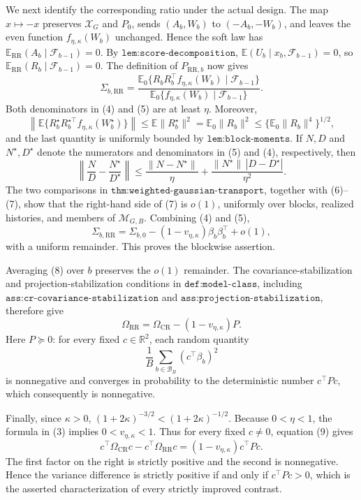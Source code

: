 We next identify the corresponding ratio under the actual design.  The map \(x\mapsto-x\) preserves \(\mathcal X_G\) and \(P_0\), sends \((A_b,W_b)\) to \((-A_b,-W_b)\), and leaves the even function \(f_{\eta,\kappa}(W_b)\) unchanged.  Hence the soft law has \(\mathbb E_{\mathrm{RR}}(A_b\mid\mathcal F_{b-1})=0\).  By \(\texttt{lem:score-decomposition}\), \(\mathbb E(U_b\mid x_b,\mathcal F_{b-1})=0\), so
\(\mathbb E_{\mathrm{RR}}(R_b\mid\mathcal F_{b-1})=0\).  The definition of \(P_{\mathrm{RR},b}\) now gives
\[
 \Sigma_{b,\mathrm{RR}}
 =\frac{\mathbb E_0\{R_bR_b^\top f_{\eta,\kappa}(W_b)
          \mid\mathcal F_{b-1}\}}
        {\mathbb E_0\{f_{\eta,\kappa}(W_b)\mid\mathcal F_{b-1}\}}. \tag{5}
\]
Both denominators in (4) and (5) are at least \(\eta\).  Moreover,
\[
 \left\|\mathbb E\{R_b^\star R_b^{\star\top}
 f_{\eta,\kappa}(W_b^\star)\}\right\|
 \leq \mathbb E\|R_b^\star\|^2
 =\mathbb E_0\|R_b\|^2
 \leq \{\mathbb E_0\|R_b\|^4\}^{1/2},                       \tag{6}
\]
and the last quantity is uniformly bounded by \(\texttt{lem:block-moments}\).  If \(N,D\) and \(N^\star,D^\star\) denote the numerators and denominators in (5) and (4), respectively, then
\[
 \left\|\frac ND-\frac{N^\star}{D^\star}\right\|
 \leq \frac{\|N-N^\star\|}{\eta}
      +\frac{\|N^\star\|\,|D-D^\star|}{\eta^2}.             \tag{7}
\]
The two comparisons in \(\texttt{thm:weighted-gaussian-transport}\), together with (6)--(7), show that the right-hand side of (7) is \(o(1)\), uniformly over blocks, realized histories, and members of \(\mathcal M_{G,B}\).  Combining (4) and (5),
\[
 \Sigma_{b,\mathrm{RR}}
 =\Sigma_{b,0}-(1-v_{\eta,\kappa})\beta_b\beta_b^\top+o(1), \tag{8}
\]
with a uniform remainder.  This proves the blockwise assertion.

Averaging (8) over \(b\) preserves the \(o(1)\) remainder.  The covariance-stabilization and projection-stabilization conditions in \(\texttt{def:model-class}\), including \(\texttt{ass:cr-covariance-stabilization}\) and \(\texttt{ass:projection-stabilization}\), therefore give
\[
 \Omega_{\mathrm{RR}}
 =\Omega_{\mathrm{CR}}-(1-v_{\eta,\kappa})P.                 \tag{9}
\]
Here \(P\succeq0\): for every fixed \(c\in\mathbb R^2\), each random quantity
\[
 \frac1B\sum_{b\in\mathcal B_B}(c^\top\beta_b)^2
\]
is nonnegative and converges in probability to the deterministic number \(c^\top Pc\), which consequently is nonnegative.

Finally, since \(\kappa>0\),
\((1+2\kappa)^{-3/2}<(1+2\kappa)^{-1/2}\).  Because \(0<\eta<1\), the formula in (3) implies \(0<v_{\eta,\kappa}<1\).  Thus for every fixed \(c\neq0\), equation (9) gives
\[
 c^\top\Omega_{\mathrm{CR}}c-c^\top\Omega_{\mathrm{RR}}c
 =(1-v_{\eta,\kappa})c^\top Pc.
\]
The first factor on the right is strictly positive and the second is nonnegative.  Hence the variance difference is strictly positive if and only if \(c^\top Pc>0\), which is the asserted characterization of every strictly improved contrast.